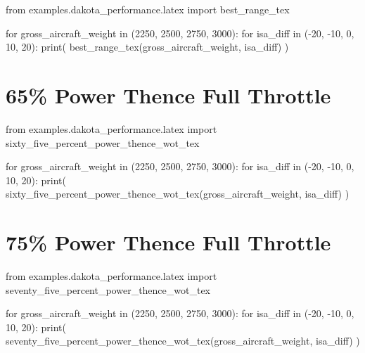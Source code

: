 \begin{pycode}
from examples.dakota_performance.latex import best_range_tex

for gross_aircraft_weight in (2250, 2500, 2750, 3000):
    for isa_diff in (-20, -10, 0, 10, 20):
        print(
            best_range_tex(gross_aircraft_weight, isa_diff)
        )
\end{pycode}

\section{65\% Power Thence Full Throttle}

\begin{pycode}
from examples.dakota_performance.latex import sixty_five_percent_power_thence_wot_tex

for gross_aircraft_weight in (2250, 2500, 2750, 3000):
    for isa_diff in (-20, -10, 0, 10, 20):
        print(
            sixty_five_percent_power_thence_wot_tex(gross_aircraft_weight, isa_diff)
        )
\end{pycode}

\section{75\% Power Thence Full Throttle}

\begin{pycode}
from examples.dakota_performance.latex import seventy_five_percent_power_thence_wot_tex

for gross_aircraft_weight in (2250, 2500, 2750, 3000):
    for isa_diff in (-20, -10, 0, 10, 20):
        print(
            seventy_five_percent_power_thence_wot_tex(gross_aircraft_weight, isa_diff)
        )
\end{pycode}
